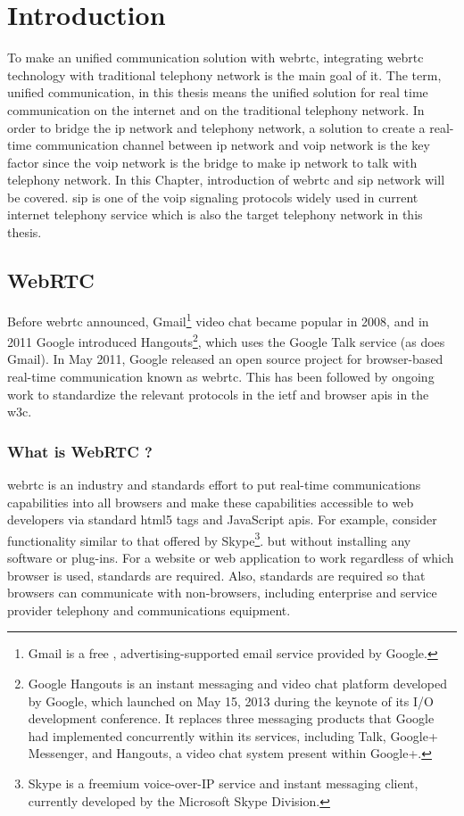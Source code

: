 \chapter{Introduction}
\label{chp:intro}
\noindent To make an unified communication solution with \gls{webrtc}, integrating \gls{webrtc} technology with traditional telephony network is the main goal of it. The term, unified communication, in this thesis means the unified solution for real time communication on the internet and on the traditional telephony network. In order to bridge the \gls{ip} network and telephony network, a solution to create a real-time communication channel between \gls{ip} network and \gls{voip} network is the key factor since the \gls{voip} network is the bridge to make \gls{ip} network to talk with telephony network. In this Chapter, introduction of \gls{webrtc} and \gls{sip} network will be covered. \gls{sip} is one of the \gls{voip} signaling protocols widely used in current internet telephony service which is also the target telephony network in this thesis.

\section{WebRTC}

\noindent Before \gls{webrtc} announced, Gmail\footnote{Gmail is a free , advertising-supported email service provided by Google.} video chat became popular in 2008, and in 2011 Google introduced Hangouts\footnote{Google Hangouts is an instant messaging and video chat platform developed by Google, which launched on May 15, 2013 during the keynote of its I/O development conference. It replaces three messaging products that Google had implemented concurrently within its services, including Talk, Google+ Messenger, and Hangouts, a video chat system present within Google+.}, which uses the Google Talk service (as does Gmail). In May 2011, Google released an open source project for browser-based real-time communication known as \gls{webrtc}. This has been followed by ongoing work to standardize the relevant protocols in the \gls{ietf} and browser \gls{api}s in the \gls{w3c}.

\subsection{What is WebRTC ?}

\noindent \gls{webrtc} is an industry and standards effort to put real-time communications capabilities into all browsers and make these capabilities accessible to web developers via standard \gls{html5} tags and JavaScript \gls{api}s. For example, consider functionality similar to that offered by Skype\footnote{Skype is a freemium voice-over-IP service and instant messaging client, currently developed by the Microsoft Skype Division.\cite{wiki:skype}}. but without installing any software or plug-ins. For a website or web application to work regardless of which browser is used, standards are required. Also, standards are required so that browsers can communicate with non-browsers, including enterprise and service provider telephony and communications equipment\cite{inbook:rtc-intro}.

